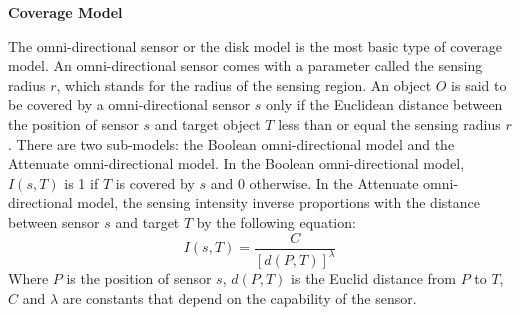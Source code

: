 \documentclass[final]{elsarticle}
\begin{document}
\noindent\textbf{Coverage Model}

The omni-directional sensor or the disk model is the most basic type of coverage model. An omni-directional sensor comes with a parameter called the sensing radius $r$, which stands for the radius of the sensing region. An object $ O $ is said to be covered by a omni-directional sensor $ s $ only if the Euclidean distance between the position of sensor $ s $ and target object $ T $ less than or equal the sensing radius $r$. There are two sub-models: the Boolean omni-directional model and the Attenuate omni-directional model. In the Boolean omni-directional model, $I(s, T)$ is 1 if $ T $ is covered by $ s $ and 0 otherwise. In the Attenuate omni-directional model, the sensing intensity inverse proportions with the distance between sensor $ s $ and target $ T $ by the following equation:
\begin{equation}
\label{eqfo}
I({s},T) = \frac{C}{{{{\left[ {d(P,T)} \right]}^\lambda }}}
\end{equation}
Where $ P $ is the position of sensor $ s $, $ d(P,T) $ is the Euclid distance from $ P $ to $ T $, $ C $ and $ \lambda $ are constants that depend on the capability of the sensor. 
\end{document}
